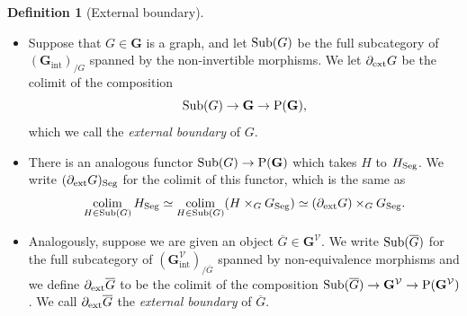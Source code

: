 \documentclass{amsart}
\numberwithin{theorem}{subsection}
\theoremstyle{definition}
\newtheorem{defn}[theorem]{Definition}
\providecommand{\xint}{\mathrm{int}}
\DeclareMathOperator*{\colim}{colim}
\newcommand{\xV}{\mathcal{V}}
\newcommand{\Pre}{\name{P}}
\newcommand{\name}[1]{\ensuremath{\text{\textup{#1}}}}
\newcommand{\bbY}{\mathbf{G}}
\newcommand{\bbYV}{\bbY^{\xV}}
\newcommand{\bbYVint}{\bbY_{\xint}^{\xV}}
\newcommand{\Dext}{\partial_{\name{ext}}}
\newcommand{\Seg}{\name{Seg}}
\begin{document}
\begin{defn}[External boundary]\label{def ext} \quad
\begin{itemize}
\item Suppose that $G\in \bbY$ is a graph, and let $\name{Sub}(G)$ be the full subcategory of $(\bbY_{\xint})_{/G}$ spanned by the non-invertible morphisms.
We let $\Dext G$ be the colimit of the composition
\[
	\name{Sub}(G) \to \bbY \to \Pre(\bbY),
\]
which we call the \emph{external boundary} of $G$.
\item There is an analogous functor $\name{Sub}(G) \to \Pre(\bbY)$ which takes $H$ to $H_{\Seg}$.
We write $(\Dext G)_{\Seg}$ for the colimit of this functor, which is the same as 
\[
	\colim_{H\in \name{Sub}(G)} H_{\Seg} \simeq \colim_{H\in \name{Sub}(G)} (H \times_{G} G_{\Seg}) \simeq (\Dext G) \times_{G} G_\Seg.
\]
\item Analogously, suppose we are given an object $\overline G \in \bbYV$.
	We write $\name{Sub}(\overline G)$ for the full subcategory of $(\bbYVint)_{/\overline G}$ spanned by non-equivalence morphisms and we define $\Dext \overline G$ to be the colimit of the composition $\name{Sub}(\overline G) \to	\bbYV \to \Pre(\bbYV)$.
	We call $\Dext \overline G$ the \emph{external boundary} of $\overline G$.
\end{itemize}
\end{defn}
\end{document}
